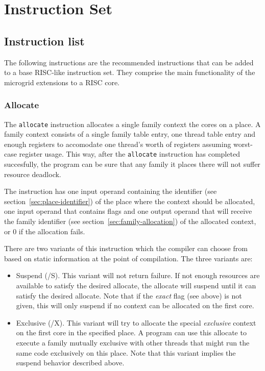 \chapter{\label{chapter:isa}Instruction Set}

\section{Instruction list}

The following instructions are the recommended instructions that can be added to a base RISC-like instruction set. They comprise the main functionality of the microgrid extensions to a RISC core.

\subsection{Allocate}
The {\tt allocate} instruction allocates a single family context the cores on a place. A family context consists of a single family table entry, one thread table entry and enough registers to accomodate one thread's worth of registers assuming worst-case register usage. This way, after the {\tt allocate} instruction has completed succesfully, the program can be sure that any family it places there will not suffer resource deadlock.

The instruction has one input operand containing the identifier (see section~\ref{sec:place-identifier}) of the place where the context should be allocated, one input operand that contains flags and one output operand that will receive the family identifier (see section~\ref{sec:family-allocation}) of the allocated context, or 0 if the allocation fails.

There are two variants of this instruction which the compiler can choose from based on static information at the point of compilation. The three variants are:
\begin{itemize}
\item Suspend (/S). This variant will not return failure. If not enough resources are available to satisfy the desired allocate, the allocate will suspend until it can satisfy the desired allocate. Note that if the \emph{exact} flag (see above) is not given, this will only suspend if no context can be allocated on the first core.
\item Exclusive (/X). This variant will try to allocate the special \emph{exclusive} context on the first core in the specified place. A program can use this allocate to execute a family mutually exclusive with other threads that might run the same code exclusively on this place. Note that this variant implies the suspend behavior described above.
\end{itemize}

